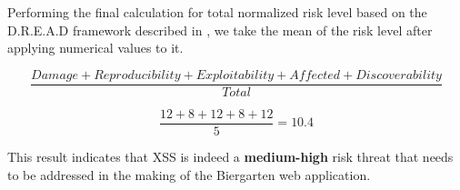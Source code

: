 \documentclass{article}
\numberwithin{equation}{section} %
\numberwithin{figure}{section} %
\numberwithin{table}{section} %
\begin{document}
Performing the final calculation for total normalized risk level based on the D.R.E.A.D framework described in \cite{spec}, we take the mean of the risk level after applying numerical values to it.

\begin{equation}
	\frac{Damage + Reproducibility + Exploitability + Affected + Discoverability}{Total}
\end{equation}

\begin{equation}
	\frac{12 + 8 + 12 + 8 + 12}{5} = 10.4
\end{equation}

This result indicates that XSS is indeed a \textbf{medium-high} risk threat that needs to be addressed in the making of the Biergarten web application.   

 

\end{document}
